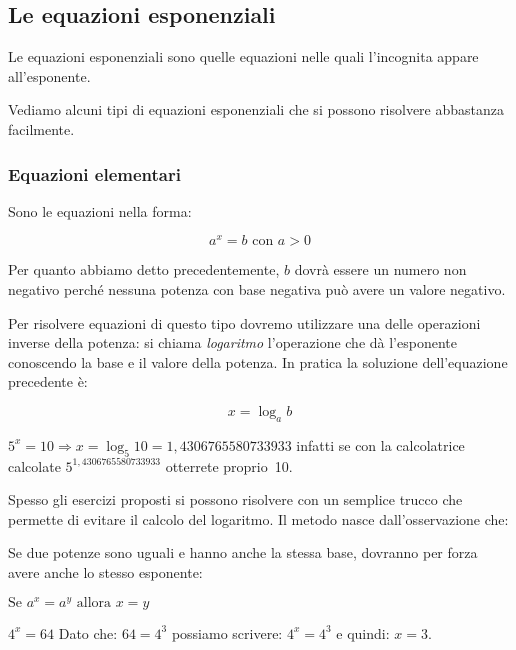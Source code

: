 \subsection{Le equazioni esponenziali}
\label{subsec:esplog_equazioniesponenziali}

\begin{definizione}{
Le equazioni esponenziali
sono quelle equazioni nelle quali l'incognita appare all'esponente.
}
\end{definizione}

Vediamo alcuni tipi di equazioni esponenziali che si possono risolvere 
abbastanza facilmente.

\subsubsection{Equazioni elementari}
\label{subsubsec:esplog_eq_elementari}

Sono le equazioni nella forma:

\[a^x=b \text{ con } a>0\]

Per quanto abbiamo detto precedentemente, \(b\) dovrà essere un numero non 
negativo perché nessuna potenza con base negativa può avere un valore negativo.

Per risolvere equazioni di questo tipo dovremo utilizzare una delle 
operazioni inverse della potenza: si chiama \emph{logaritmo} l'operazione che 
dà l'esponente conoscendo la base e il valore della potenza. 
In pratica la soluzione dell'equazione precedente è:

\[x = \log_a b\]

\begin{esempio}
\(5^x=10 \Rightarrow x=\log_5 10 = 1,4306765580733933\)
infatti se con la calcolatrice calcolate \(5^{1,4306765580733933}\) 
otterrete proprio~10.
\end{esempio}

Spesso gli esercizi proposti si possono risolvere con un semplice trucco che 
permette di evitare il calcolo del logaritmo. 
Il metodo nasce dall'osservazione che:

\begin{osservazione}
 Se due potenze sono uguali e hanno anche la stessa base, dovranno per 
forza avere anche lo stesso esponente: 

\(\text{Se } a^x = a^y \text{ allora } x=y\)
\end{osservazione}

\begin{esempio}
\(4^x=64\) Dato che: \(64=4^3\) possiamo scrivere: \(4^x=4^3\) 
e quindi: \(x=3\).
\end{esempio}

